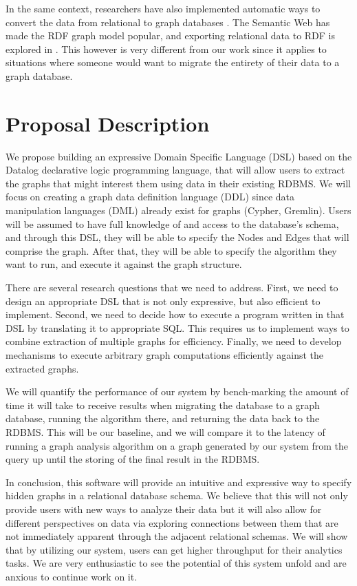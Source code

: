 \documentclass[12pt]{article}
\begin{document}
In the same context, researchers have also implemented automatic ways to convert the data from relational to graph databases \cite{de_virgilio_converting_2013}. The Semantic Web has made the RDF graph model popular, and exporting relational data to RDF is explored in \cite{hert_comparison_2011}. This however is very different from our work since it applies to situations where someone would want to migrate the entirety of their data to a graph database.

\section*{Proposal Description}

We propose building an expressive Domain Specific Language (DSL) based on the Datalog \cite{green_datalog_2013} declarative logic programming language, that will allow users to extract the graphs that might interest them using data in their existing RDBMS. We will focus on creating a graph data definition language (DDL) since data manipulation languages (DML) already exist for graphs (Cypher, Gremlin).  Users will be assumed to have full knowledge of and access to the database's schema, and through this DSL, they will be able to specify the Nodes and Edges that will comprise the graph. After that, they will be able to specify the algorithm they want to run, and execute it against the graph structure.

There are several research questions that we need to address. First, we need to design an appropriate DSL that is not only expressive, but also efficient to implement. Second, we need to decide how to execute a program written in that DSL by translating it to appropriate SQL. This requires us to implement ways to combine extraction of multiple graphs for efficiency. Finally, we need to develop mechanisms to execute arbitrary graph computations efficiently against the extracted graphs.

We will quantify the performance of our system by bench-marking the amount of time it will take to receive results when migrating the database to a graph database, running the algorithm there, and returning the data back to the RDBMS. This will be our baseline, and we will compare it to the latency of running a graph analysis algorithm on a graph generated by our system from the query up until the storing of the final result in the RDBMS.

In conclusion, this software will provide an intuitive and expressive way to specify hidden graphs in a relational database schema. We believe that this will not only provide users with new ways to analyze their data but it will also allow for different perspectives on data via exploring connections between them that are not immediately apparent through the adjacent relational schemas. We will show that by utilizing our system, users can get higher throughput for their analytics tasks. We are very enthusiastic to see the potential of this system unfold and are anxious to continue work on it.



\end{document}
